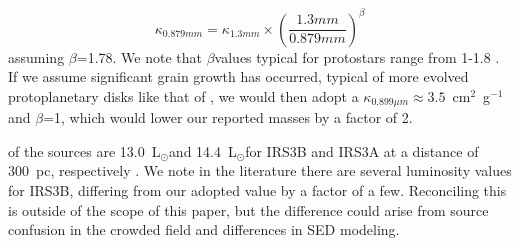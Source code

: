 \documentclass[twocolumn, 12pt,trackchanges]{aastex63}
\newcommand{\lsun}{L$_{\odot}$}
\begin{document}
\begin{equation}
    \kappa_{0.879 mm} = \kappa_{1.3 mm}\times\left(\frac{1.3 mm}{0.879 mm}\right)^{\beta}
\end{equation}
assuming $\beta$=1.78. We note that $\beta$\space values typical for protostars range from 1-1.8 \citep{2009ApJ...696..841K, 2013PhDT.......434S}.  If we assume significant grain growth has occurred, typical of more evolved protoplanetary disks like that of \citet{2009ApJ...700.1502A}, we would then adopt a $\kappa_{0.899\mu m}\approx3.5$~cm$^{2}$~g$^{-1}$\space and $\beta$=1, which would lower our reported masses by a factor of 2.

 of the sources are  13.0~\lsun\space and 14.4~\lsun\space for IRS3B and IRS3A at a distance of 300~pc, respectively \citep[8.3~\lsun\space and 9.2~\lsun\space for IRS3B and IRS3A, respectively at 230~pc; ][]{2016ApJ...818...73T}. We note  in the literature there are several luminosity values for IRS3B, differing from our adopted value by a factor of a few. Reconciling this is outside of the scope of this paper, but the difference could arise from source confusion in the crowded field and differences in SED modeling.
\end{document}
